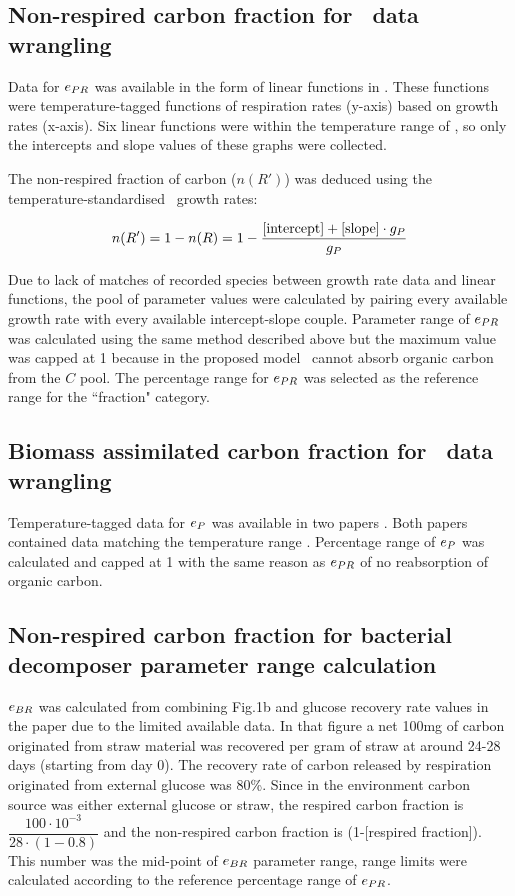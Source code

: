 \documentclass[env.tex]{subfiles}
\begin{document}
\subsection{Non-respired carbon fraction for \phy\ data wrangling}
Data for $e_{PR}$ was available in the form of linear functions in \autocite{j1989respiration}.  These functions were temperature-tagged functions of respiration rates (y-axis) based on growth rates (x-axis).  Six linear functions were within the temperature range of \temp, so only the intercepts and slope values of these graphs were collected.

The non-respired fraction of carbon ($n(R')$) was deduced using the temperature-standardised \phy\ growth rates:

\begin{equation}
    n(R') = 1-n(R) = 1-\dfrac{[\text{intercept}]+[\text{slope}]\cdot g_P}{g_P}
    \label{ePReqn}
\end{equation}

Due to lack of matches of recorded species between growth rate data and linear functions, the pool of parameter values were calculated by pairing every available growth rate with every available intercept-slope couple.  Parameter range of $e_{PR}$ was calculated using the same method described above but the maximum value was capped at 1 because in the proposed model \phy\ cannot absorb organic carbon from the $C$ pool.  The percentage range for $e_{PR}$ was selected as the reference range for the ``fraction" category.

\subsection{Biomass assimilated carbon fraction for \phy\ data wrangling}
Temperature-tagged data for $e_P$ was available in two papers \autocite{j1989respiration,samejima1958heterotrophic}.  Both papers contained data matching the temperature range \temp.  Percentage range of $e_P$ was calculated and capped at 1 with the same reason as $e_{PR}$ of no reabsorption of organic carbon.

\subsection{Non-respired carbon fraction for bacterial decomposer parameter range calculation}
$e_{BR}$ was calculated from combining Fig.1b and glucose recovery rate values in the paper \autocite{cochran1988estimation} due to the limited available data.  In that figure a net 100mg of carbon originated from straw material was recovered per gram of straw at around 24-28 days (starting from day 0).  The recovery rate of carbon released by respiration originated from external glucose was 80\%.  Since in the environment carbon source was either external glucose or straw, the respired carbon fraction is $\dfrac{100\cdot10^{-3}}{28\cdot(1-0.8)}$ and the non-respired carbon fraction is (1-[respired fraction]).  This number was the mid-point of $e_{BR}$ parameter range, range limits were calculated according to the reference percentage range of $e_{PR}$.
\end{document}
